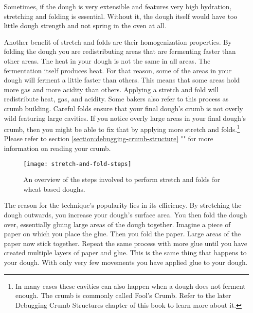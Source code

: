 Sometimes, if the dough is very extensible
and features very high hydration, stretching and folding is essential.
Without it, the dough itself would have too little dough strength and not
spring in the oven at all.

Another benefit of stretch and folds are their homogenization properties. By
folding the dough you are redistributing areas that are fermenting faster
than other areas. The heat in your dough is not the same in all areas.
The fermentation itself produces heat. For that reason, some of the areas in
your dough will ferment a little faster than others. This means that some
areas hold more gas and more acidity than others. Applying a stretch and fold
will redistribute heat, gas, and acidity. Some bakers also refer to this
process as crumb building. Careful folds ensure that your final dough's crumb
is not overly wild featuring large cavities. If you notice overly
large areas in your final dough's crumb, then you might be able to fix that
by applying more stretch and folds.\footnote{In many cases these cavities can
also happen when a dough does not ferment enough. The crumb is commonly called
Fool's Crumb. Refer to the later Debugging Crumb Structures chapter of this
book to learn more about it.} Please refer to section \ref{section:debugging-crumb-structure}
"" for more information on reading
your crumb.

\begin{figure}[!htb]
  \texttt{[image: stretch-and-fold-steps]}
  \caption{An overview of the steps involved to perform stretch and folds
  for wheat-based doughs.}
  \label{figure:stretch-and-fold-steps}
\end{figure}

The reason for the technique's popularity lies in its efficiency. By stretching
the dough outwards, you increase your dough's surface area. You then fold the
dough over, essentially gluing large areas of the dough together. Imagine a
piece of paper on which you place the glue. Then you fold the paper. Large areas
of the paper now stick together. Repeat the same process with more glue until
you have created multiple layers of paper and glue. This is the same thing that
happens to your dough. With only very few movements you have applied glue to your
dough.

